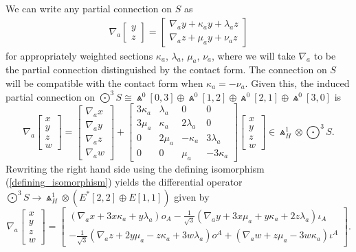 \documentclass[pdftex]{sigma}%
\numberwithin{equation}{section}
\begin{document}
We can write any partial connection on $S$ as
\begin{gather*}%
\nabla_{a} \begin{bmatrix}
y \\
z
\end{bmatrix}
= \begin{bmatrix}
\nabla_{a} y + \kappa_{a}y + \lambda_{a}z \\
\nabla_{a} z + \mu_{a} y + \nu_{a} z
\end{bmatrix}
\end{gather*}
for appropriately weighted sections $\kappa_{a}$, $\lambda_{a}$, $\mu_{a}$,
$\nu_{a}$, where we will take $\nabla_a$ to be the partial connection
distinguished by the contact form. The connection on $S$ will be compatible
with the contact form when $\kappa_{a} = -\nu_{a}$. Given this, the induced
partial connection on $\bigodot^3\!S \cong \Wedge^0[0,3] \oplus \Wedge^0[1,2]
\oplus \Wedge^0[2,1] \oplus \Wedge^0[3,0] $ is
\[\textstyle
\nabla_{a}
\begin{bmatrix}
x \\
y \\
z \\
w
\end{bmatrix} =
\begin{bmatrix}
\nabla_{a}x \\
\nabla_{a}y \\
\nabla_{a}z \\
\nabla_{a}w
\end{bmatrix} +
\begin{bmatrix}
3\kappa_{a} & \lambda_{a} & 0 & 0 \\
3\mu_{a}& \kappa_{a}& 2\lambda_{a}& 0 \\
0 & 2\mu_{a} & -\kappa_{a} & 3\lambda_{a}\\
0 & 0 & \mu_{a}& -3\kappa_{a}
\end{bmatrix}\begin{bmatrix}
x \\
y \\
z \\
w
\end{bmatrix} \in \Wedge_H^1 \otimes \bigodot^3\!S.
\]
Rewriting the right hand side using the defining isomorphism
(\ref{defining_isomorphism}) yields the differential operator
$\bigodot^3\!S \to \Wedge_H^1 \otimes (E^*[2,2] \oplus E[1,1])$ given by
\[\nabla_{a}
\begin{bmatrix}
x \\
y \\
z \\
w
\end{bmatrix} = \begin{bmatrix}
(\nabla_{a}x + 3x\kappa_{a} +
y\lambda_{a})o_A-\frac{1}{\sqrt{3}}(\nabla_{a}y +
3x\mu_{a} + y\kappa_{a} + 2z\lambda_{a})\iota_A \\[5pt]
-\frac{1}{\sqrt{3}}(\nabla_{a}z +
2y\mu_{a} - z\kappa_{a} + 3w\lambda_{a})o^A + (\nabla_{a}w
+ z\mu_{a} - 3w\kappa_{a})\iota^A
\end{bmatrix}.\]
\end{document}
